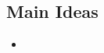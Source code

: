 \documentclass[]{article}
\begin{document}
\newpage
\begin{TeacherMargin}
	
\end{TeacherMargin}
\begin{PresentSpace}
\section*{Main Ideas}
\begin{itemize}
	\item 
\end{itemize}
\end{PresentSpace}
\end{document}
